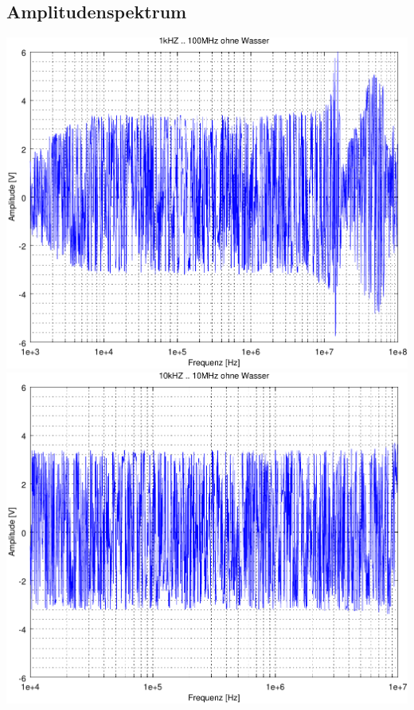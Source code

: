 \documentclass[a4,paper,fleqn]{article}
\begin{document}
\subsection{Amplitudenspektrum}
\begin{minipage}{0.45\textwidth}
    \includegraphics[width=1.0\textwidth]{mess01/scope_1.pdf}
    \includegraphics[width=1.0\textwidth]{mess01/scope_2.pdf}
\end{minipage}
\end{document}
